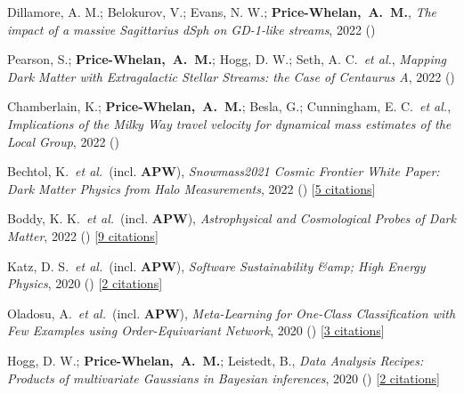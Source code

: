 \item[{\color{deemph}\scriptsize14}]Dillamore, A. M.; Belokurov, V.; Evans, N. W.; \textbf{Price-Whelan,~A.~M.}, \textit{The impact of a massive Sagittarius dSph on GD-1-like streams}, 2022 ()

\item[{\color{deemph}\scriptsize13}]Pearson, S.; \textbf{Price-Whelan,~A.~M.}; Hogg, D. W.; Seth, A. C.~\textit{et al.}, \textit{Mapping Dark Matter with Extragalactic Stellar Streams: the Case of Centaurus A}, 2022 ()

\item[{\color{deemph}\scriptsize12}]Chamberlain, K.; \textbf{Price-Whelan,~A.~M.}; Besla, G.; Cunningham, E. C.~\textit{et al.}, \textit{Implications of the Milky Way travel velocity for dynamical mass estimates of the Local Group}, 2022 ()

\item[{\color{deemph}\scriptsize11}]Bechtol, K.~\textit{et al.}~(incl. \textbf{APW}), \textit{Snowmass2021 Cosmic Frontier White Paper: Dark Matter Physics from Halo Measurements}, 2022 () [\href{http://adsabs.harvard.edu/abs/2022arXiv220307354B}{5 citations}]

\item[{\color{deemph}\scriptsize10}]Boddy, K. K.~\textit{et al.}~(incl. \textbf{APW}), \textit{Astrophysical and Cosmological Probes of Dark Matter}, 2022 () [\href{http://adsabs.harvard.edu/abs/2022arXiv220306380B}{9 citations}]

\item[{\color{deemph}\scriptsize9}]Katz, D. S.~\textit{et al.}~(incl. \textbf{APW}), \textit{Software Sustainability {\&}amp; High Energy Physics}, 2020 () [\href{http://adsabs.harvard.edu/abs/2020arXiv201005102K}{2 citations}]

\item[{\color{deemph}\scriptsize8}]Oladosu, A.~\textit{et al.}~(incl. \textbf{APW}), \textit{Meta-Learning for One-Class Classification with Few Examples using Order-Equivariant Network}, 2020 () [\href{http://adsabs.harvard.edu/abs/2020arXiv200704459O}{3 citations}]

\item[{\color{deemph}\scriptsize7}]Hogg, D. W.; \textbf{Price-Whelan,~A.~M.}; Leistedt, B., \textit{Data Analysis Recipes: Products of multivariate Gaussians in Bayesian inferences}, 2020 () [\href{http://adsabs.harvard.edu/abs/2020arXiv200514199H}{2 citations}]

